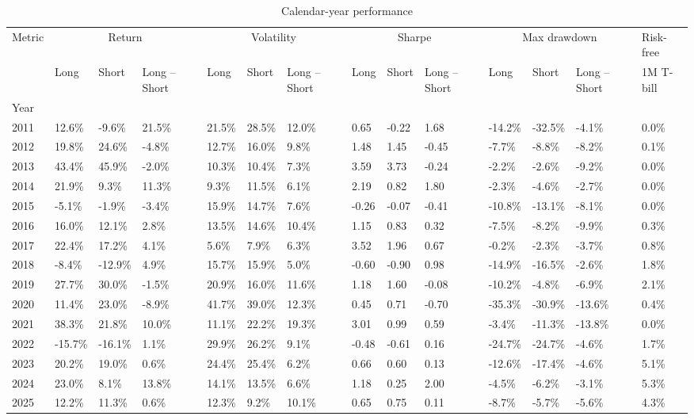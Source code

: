 \begin{table}
\caption{Calendar-year performance}
\label{tab:yearly}
\begin{tabular}{llllllllllllll}
\toprule
Metric & \multicolumn{3}{c}{Return} & \multicolumn{3}{c}{Volatility} & \multicolumn{3}{c}{Sharpe} & \multicolumn{3}{c}{Max drawdown} & Risk-free \\
 & Long & Short & Long – Short & Long & Short & Long – Short & Long & Short & Long – Short & Long & Short & Long – Short & 1M T-bill \\
Year &  &  &  &  &  &  &  &  &  &  &  &  &  \\
\midrule
2011 & 12.6\% & -9.6\% & 21.5\% & 21.5\% & 28.5\% & 12.0\% & 0.65 & -0.22 & 1.68 & -14.2\% & -32.5\% & -4.1\% & 0.0\% \\
2012 & 19.8\% & 24.6\% & -4.8\% & 12.7\% & 16.0\% & 9.8\% & 1.48 & 1.45 & -0.45 & -7.7\% & -8.8\% & -8.2\% & 0.1\% \\
2013 & 43.4\% & 45.9\% & -2.0\% & 10.3\% & 10.4\% & 7.3\% & 3.59 & 3.73 & -0.24 & -2.2\% & -2.6\% & -9.2\% & 0.0\% \\
2014 & 21.9\% & 9.3\% & 11.3\% & 9.3\% & 11.5\% & 6.1\% & 2.19 & 0.82 & 1.80 & -2.3\% & -4.6\% & -2.7\% & 0.0\% \\
2015 & -5.1\% & -1.9\% & -3.4\% & 15.9\% & 14.7\% & 7.6\% & -0.26 & -0.07 & -0.41 & -10.8\% & -13.1\% & -8.1\% & 0.0\% \\
2016 & 16.0\% & 12.1\% & 2.8\% & 13.5\% & 14.6\% & 10.4\% & 1.15 & 0.83 & 0.32 & -7.5\% & -8.2\% & -9.9\% & 0.3\% \\
2017 & 22.4\% & 17.2\% & 4.1\% & 5.6\% & 7.9\% & 6.3\% & 3.52 & 1.96 & 0.67 & -0.2\% & -2.3\% & -3.7\% & 0.8\% \\
2018 & -8.4\% & -12.9\% & 4.9\% & 15.7\% & 15.9\% & 5.0\% & -0.60 & -0.90 & 0.98 & -14.9\% & -16.5\% & -2.6\% & 1.8\% \\
2019 & 27.7\% & 30.0\% & -1.5\% & 20.9\% & 16.0\% & 11.6\% & 1.18 & 1.60 & -0.08 & -10.2\% & -4.8\% & -6.9\% & 2.1\% \\
2020 & 11.4\% & 23.0\% & -8.9\% & 41.7\% & 39.0\% & 12.3\% & 0.45 & 0.71 & -0.70 & -35.3\% & -30.9\% & -13.6\% & 0.4\% \\
2021 & 38.3\% & 21.8\% & 10.0\% & 11.1\% & 22.2\% & 19.3\% & 3.01 & 0.99 & 0.59 & -3.4\% & -11.3\% & -13.8\% & 0.0\% \\
2022 & -15.7\% & -16.1\% & 1.1\% & 29.9\% & 26.2\% & 9.1\% & -0.48 & -0.61 & 0.16 & -24.7\% & -24.7\% & -4.6\% & 1.7\% \\
2023 & 20.2\% & 19.0\% & 0.6\% & 24.4\% & 25.4\% & 6.2\% & 0.66 & 0.60 & 0.13 & -12.6\% & -17.4\% & -4.6\% & 5.1\% \\
2024 & 23.0\% & 8.1\% & 13.8\% & 14.1\% & 13.5\% & 6.6\% & 1.18 & 0.25 & 2.00 & -4.5\% & -6.2\% & -3.1\% & 5.3\% \\
2025 & 12.2\% & 11.3\% & 0.6\% & 12.3\% & 9.2\% & 10.1\% & 0.65 & 0.75 & 0.11 & -8.7\% & -5.7\% & -5.6\% & 4.3\% \\
\bottomrule
\end{tabular}
\end{table}
